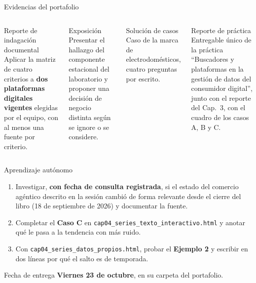 \documentclass[aspectratio=169,xcolor=dvipsnames]{beamer}
\begin{document}
\begin{frame}{Evidencias del portafolio}
\small
\begin{columns}[T]
  \begin{block}{Reporte de indagación documental}
    \scriptsize Aplicar la matriz de cuatro criterios a \textbf{dos plataformas digitales vigentes} elegidas por el equipo, con al menos una fuente por criterio.
  \end{block}
  \begin{block}{Exposición}
    \scriptsize Presentar el hallazgo del componente estacional del laboratorio y proponer una decisión de negocio distinta según se ignore o se considere.
  \end{block}
  \begin{block}{Solución de casos}
    \scriptsize Caso de la marca de electrodomésticos, cuatro preguntas por escrito.
  \end{block}
  \begin{block}{Reporte de práctica}
    \scriptsize Entregable único de la práctica \enquote{Buscadores y plataformas en la gestión de datos del consumidor digital}, junto con el reporte del Cap.~3, con el cuadro de los casos A, B y C.
  \end{block}
\end{columns}
\end{frame}

\begin{frame}{Aprendizaje autónomo}
\footnotesize
\begin{enumerate}
  \item Investigar, \textbf{con fecha de consulta registrada}, si el estado del comercio agéntico descrito en la sesión cambió de forma relevante desde el cierre del libro (18 de septiembre de 2026) y documentar la fuente.
  \vspace{1pt}
  \item Completar el \textbf{Caso C} en \texttt{cap04\_series\_texto\_\allowbreak interactivo.html} y anotar qué le pasa a la tendencia con más ruido.
  \vspace{1pt}
  \item Con \texttt{cap04\_series\_datos\_propios.html}, probar el \textbf{Ejemplo 2} y escribir en dos líneas por qué el salto es de temporada.
\end{enumerate}
\vspace{2pt}
\begin{alertblock}{Fecha de entrega}
  \textbf{Viernes 23 de octubre}, en su carpeta del portafolio.
\end{alertblock}
\end{frame}
\end{document}
